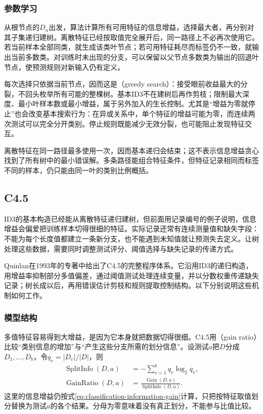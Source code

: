 \subsubsection{参数学习}
\label{sec:classification-id3-learning}

从根节点的$D_n$出发，算法计算所有可用特征的信息增益，选择最大者，再分别对其子集递归建树。离散特征已经按取值完全展开后，同一路径上不必再次使用它。若当前样本全部同类，就生成该类叶节点；若可用特征耗尽而标签仍不一致，就输出当前多数类。对训练时未出现的分支，可以保留以父节点多数类为输出的回退叶节点，使预测规则对新输入仍有定义。

每次选择只依据当前节点，因而这是（greedy search）：接受眼前收益最大的分裂，不回头枚举所有可能的整棵树。基本ID3不在建树后再作剪枝；限制最大深度、最小叶样本数或最小增益，属于另外加入的生长控制。尤其是“增益为零就停止”也会改变基本搜索行为：在异或关系中，单个特征的增益可能为零，而连续两次测试可以完全分开类别。停止规则既能减少无效分裂，也可能阻止发现特征交互。

离散特征在同一路径最多使用一次，因而基本递归会结束；这不表示信息增益贪心找到了所有树中的最小错误解。多条路径能组合特征条件，但特征记录相同而标签不同的样本，仍只能由同一叶的类别比例概括。

\subsection{C4.5}
\label{sec:classification-c45}

ID3的基本构造已经能从离散特征递归建树，但前面用记录编号的例子说明，信息增益会偏爱把训练样本切得很细的特征。实际记录还常有连续测量值和缺失字段：不能为每个长度值都建立一条新分支，也不能遇到未知值就让预测失去定义。让树处理这些数据，需要同时调整测试评分、阈值选择与缺失记录的传递方式。

Quinlan在1993年的专著中给出了C4.5的完整程序体系。它沿用ID3的递归构造，用增益率抑制部分多值偏差，通过阈值测试处理连续变量，并以分数权重传递缺失记录；树长成以后，再用错误估计剪枝和规则提取控制结构。以下分别说明这些机制如何工作。

\subsubsection{模型结构}
\label{sec:classification-c45-structure}

多值特征容易得到大增益，是因为它本身就把数据切得很细。C4.5用（gain ratio）比较“类别信息的增加”与“产生这些分支所需的划分信息”。设测试$a$把$D$分成$D_1,\ldots,D_b$，令$q_v=|D_v|/|D|$，则
\begin{align}
  \operatorname{SplitInfo}(D,a)
  &=-\sum_{v=1}^{b}q_v\log_2 q_v,
  \label{eq:classification-split-information}\\
  \operatorname{GainRatio}(D,a)
  &=\frac{\operatorname{Gain}(D,a)}
  {\operatorname{SplitInfo}(D,a)}.
  \label{eq:classification-gain-ratio}
\end{align}
这里的信息增益仍按式\eqref{eq:classification-information-gain}计算，只把按特征取值划分替换为测试$a$的各个结果。分母为零意味着没有真正划分，不能参与比值比较。

